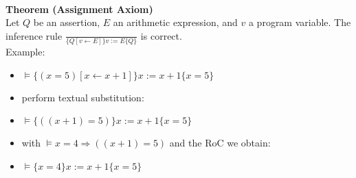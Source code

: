 \begin{multicols}{2}
\\
\textbf{Theorem (Assignment Axiom)}\\
Let $Q$ be an assertion, $E$ an arithmetic expression, and $v$ a program variable. The inference rule $\frac{}{\{Q[v \leftarrow E]\} v := E\{Q\}}$ is correct.\\
Example:
\begin{itemize}
  \item [\-] $\models \{ \left( x=5 \right)[x \leftarrow x+1]\} x := x+1 \{x=5\}$
  \item [\-] perform textual substitution:
  \item [\-] $\models \{ \left(\left(x+1\right)=5\right) \} x := x+1 \{x=5\}$
  \item [\-] with $\models x=4 \Rightarrow \left(\left(x+1\right)=5\right)$ and the RoC we obtain:
  \item [\-] $\models \{x=4\} x := x+1 \{x=5\}$
\end{itemize}


\end{multicols}
